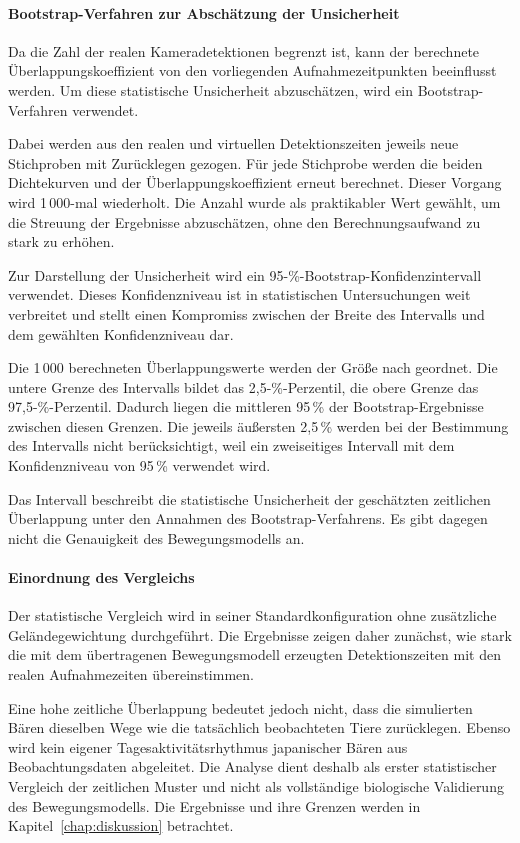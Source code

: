 \documentclass[12pt,a4paper]{report}
\begin{document}
\paragraph{Bootstrap-Verfahren zur Abschätzung der Unsicherheit}

Da die Zahl der realen Kameradetektionen begrenzt ist,
kann der berechnete Überlappungskoeffizient von den
vorliegenden Aufnahmezeitpunkten beeinflusst werden.
Um diese statistische Unsicherheit abzuschätzen,
wird ein Bootstrap-Verfahren verwendet.

Dabei werden aus den realen und virtuellen
Detektionszeiten jeweils neue Stichproben mit
Zurücklegen gezogen. Für jede Stichprobe werden
die beiden Dichtekurven und der
Überlappungskoeffizient erneut berechnet.
Dieser Vorgang wird 1\,000-mal wiederholt.
Die Anzahl wurde als praktikabler Wert gewählt,
um die Streuung der Ergebnisse abzuschätzen,
ohne den Berechnungsaufwand zu stark zu erhöhen.

Zur Darstellung der Unsicherheit wird ein
95-\%-Bootstrap-Konfidenzintervall verwendet.
Dieses Konfidenzniveau ist in statistischen
Untersuchungen weit verbreitet und stellt
einen Kompromiss zwischen der Breite des
Intervalls und dem gewählten Konfidenzniveau dar.

Die 1\,000 berechneten Überlappungswerte werden
der Größe nach geordnet. Die untere Grenze
des Intervalls bildet das 2,5-\%-Perzentil,
die obere Grenze das 97,5-\%-Perzentil.
Dadurch liegen die mittleren 95\,\% der
Bootstrap-Ergebnisse zwischen diesen Grenzen.
Die jeweils äußersten 2,5\,\% werden bei der
Bestimmung des Intervalls nicht berücksichtigt,
weil ein zweiseitiges Intervall mit dem
Konfidenzniveau von 95\,\% verwendet wird.

Das Intervall beschreibt die statistische
Unsicherheit der geschätzten zeitlichen
Überlappung unter den Annahmen des
Bootstrap-Verfahrens. Es gibt dagegen
nicht die Genauigkeit des Bewegungsmodells an.

\paragraph{Einordnung des Vergleichs}

Der statistische Vergleich wird in seiner
Standardkonfiguration ohne zusätzliche
Geländegewichtung durchgeführt. Die Ergebnisse
zeigen daher zunächst, wie stark die mit dem
übertragenen Bewegungsmodell erzeugten
Detektionszeiten mit den realen Aufnahmezeiten
übereinstimmen.

Eine hohe zeitliche Überlappung bedeutet jedoch
nicht, dass die simulierten Bären dieselben
Wege wie die tatsächlich beobachteten Tiere
zurücklegen. Ebenso wird kein eigener
Tagesaktivitätsrhythmus japanischer Bären
aus Beobachtungsdaten abgeleitet. Die Analyse
dient deshalb als erster statistischer Vergleich
der zeitlichen Muster und nicht als vollständige
biologische Validierung des Bewegungsmodells.
Die Ergebnisse und ihre Grenzen werden in
Kapitel~\ref{chap:diskussion} betrachtet.
\end{document}
